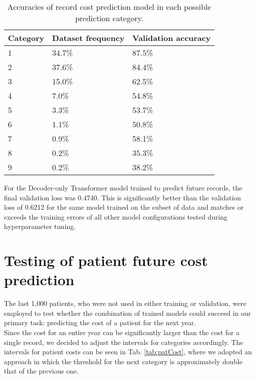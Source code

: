 \begin{table}[!h]
	\centering
	\begin{tabular}{|l|l|l|}
		\hline
		Category & Dataset frequency & Validation accuracy \\ \hline
		1        & 34.7\%           & 87.5\%              \\ \hline
		2        & 37.6\%           & 84.4\%              \\ \hline
		3        & 15.0\%           & 62.5\%              \\ \hline
		4        & 7.0\%            & 54.8\%              \\ \hline
		5        & 3.3\%            & 53.7\%              \\ \hline
		6        & 1.1\%            & 50.8\%              \\ \hline
		7        & 0.9\%            & 58.1\%              \\ \hline
		8        & 0.2\%            & 35.3\%              \\ \hline
		9        & 0.2\%            & 38.2\%              \\ \hline
	\end{tabular}
	\caption{Accuracies of record cost prediction model in each possible prediction category.}
	\label{tab:cat_acc}
\end{table}
 
For the Decoder-only Transformer model trained to predict future records, the final validation loss was 0.4740. This is significantly better than the validation loss of 0.6212 for the same model trained on the subset of data and matches or exceeds the training errors of all other model configurations tested during hyperparameter tuning.
\newpage

\section{Testing of patient future cost prediction}
\label{pat_fut_res}

The last 1,000 patients, who were not used in either training or validation, were employed to test whether the combination of trained models could succeed in our primary task: predicting the cost of a patient for the next year.
\\

Since the cost for an entire year can be significantly larger than the cost for a single record, we decided to adjust the intervals for categories accordingly. The intervals for patient costs can be seen in Tab. \ref{tab:patCost}, where we adopted an approach in which the threshold for the next category is approximately double that of the previous one.
\\

